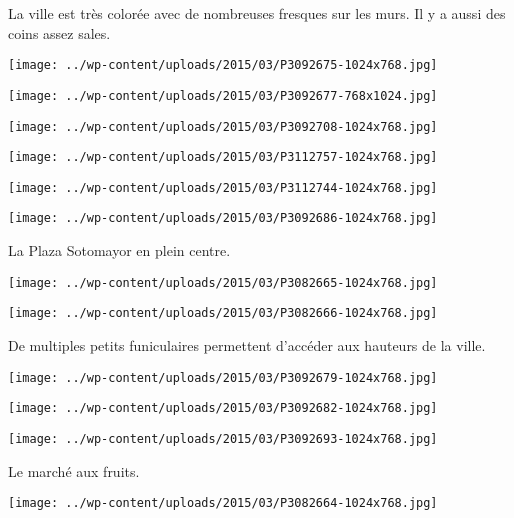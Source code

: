 La ville est très colorée avec de nombreuses fresques sur les murs. Il y a aussi des coins assez sales.
\begin{center} \texttt{[image: ../wp-content/uploads/2015/03/P3092675-1024x768.jpg]} \end{center}
\begin{center} \texttt{[image: ../wp-content/uploads/2015/03/P3092677-768x1024.jpg]} \end{center}
\begin{center} \texttt{[image: ../wp-content/uploads/2015/03/P3092708-1024x768.jpg]} \end{center}
\begin{center} \texttt{[image: ../wp-content/uploads/2015/03/P3112757-1024x768.jpg]} \end{center}
\begin{center} \texttt{[image: ../wp-content/uploads/2015/03/P3112744-1024x768.jpg]} \end{center}
\begin{center} \texttt{[image: ../wp-content/uploads/2015/03/P3092686-1024x768.jpg]} \end{center}

 La Plaza Sotomayor en plein centre.
\begin{center} \texttt{[image: ../wp-content/uploads/2015/03/P3082665-1024x768.jpg]} \end{center}
\begin{center} \texttt{[image: ../wp-content/uploads/2015/03/P3082666-1024x768.jpg]} \end{center}

 De multiples petits funiculaires permettent d'accéder aux hauteurs de la ville.
\begin{center} \texttt{[image: ../wp-content/uploads/2015/03/P3092679-1024x768.jpg]} \end{center}
\begin{center} \texttt{[image: ../wp-content/uploads/2015/03/P3092682-1024x768.jpg]} \end{center}
\begin{center} \texttt{[image: ../wp-content/uploads/2015/03/P3092693-1024x768.jpg]} \end{center}

\pagebreak
Le marché aux fruits.
\begin{center} \texttt{[image: ../wp-content/uploads/2015/03/P3082664-1024x768.jpg]} \end{center}


